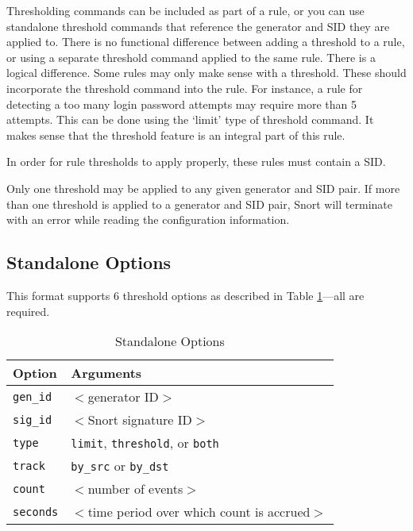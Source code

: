 \documentclass[english]{report}
\begin{document}
Thresholding commands can be included as part of a rule, or you can use
standalone threshold commands that reference the generator and SID they are
applied to. There is no functional difference between adding a threshold to a
rule, or using a separate threshold command applied to the same rule.   There
is a logical difference.  Some rules may only make sense with a threshold.
These should incorporate the threshold command into the rule.  For instance, a
rule for detecting a too many login password attempts may require more than 5
attempts.  This can be done using the `limit' type of threshold command.  It
makes sense that the threshold feature is an integral part of this rule.

In order for rule thresholds to apply properly, these rules must contain a
SID.

Only one threshold may be applied to any given generator and SID pair.  If more
than one threshold is applied to a generator and SID pair, Snort will terminate
with an error while reading the configuration information. 
                 
\subsection{Standalone Options}

This format supports 6 threshold options as described in Table \ref{standalone_options}---all are required.

\begin{table}[!htbp]
\caption{Standalone Options\label{standalone_options}}
\begin{center}\begin{tabular}{| l | p{3.5in} |}
\hline
\textbf{Option} & \textbf{Arguments}\\
\hline
\hline
\texttt{gen\_id} & $<$generator ID$>$\\
\hline
\texttt{sig\_id} & $<$Snort signature ID$>$ \\
\hline
\texttt{type} & \texttt{limit}, \texttt{threshold}, or \texttt{both} \\
\hline
\texttt{track} & \texttt{by\_src} or \texttt{by\_dst} \\
\hline
\texttt{count} & $<$number of events$>$ \\
\hline
\texttt{seconds} & $<$time period over which count is accrued$>$ \\
\hline
\end{tabular}\end{center}
\end{table}
\end{document}
